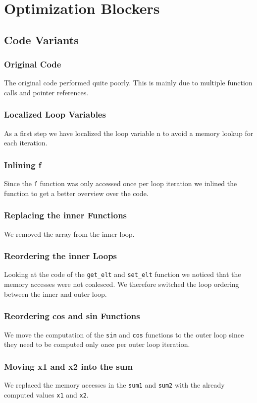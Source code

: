 \documentclass[portrait,a4paper]{article}
\begin{document}
\section{Optimization Blockers}
\subsection{Code Variants}
\subsubsection{Original Code}
The original code performed quite poorly. This is mainly due to multiple function calls and pointer references.
\subsubsection{Localized Loop Variables}
As a first step we have localized the loop variable n to avoid a memory lookup for each iteration.
\subsubsection{Inlining f}
Since the \lstinline{f} function was only accessed once per loop iteration we inlined the function to get a better overview over the code. 
\subsubsection{Replacing the inner Functions}
We removed the array from the inner loop.
\subsubsection{Reordering the inner Loops}
Looking at the code of the \lstinline{get_elt} and \lstinline{set_elt} function we noticed that
the memory accesses were not coalesced. We therefore switched the loop ordering between the inner and outer loop.
\subsubsection{Reordering cos and sin Functions}
We move the computation of the \lstinline{sin} and \lstinline{cos} functions to the outer loop since they need to be computed only once per outer loop iteration.
\subsubsection{Moving x1 and x2 into the sum}
We replaced the memory accesses in the \lstinline{sum1} and \lstinline{sum2} with the already computed values \lstinline{x1} and \lstinline{x2}.
\end{document}
